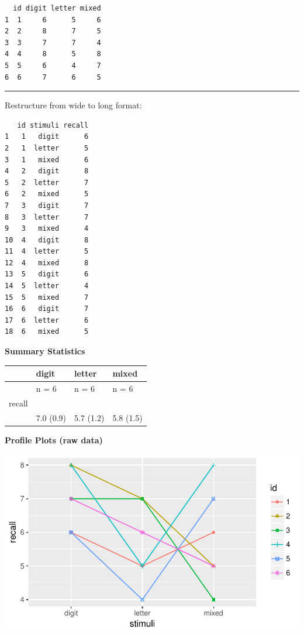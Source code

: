 \documentclass[]{article}
\begin{document}
\begin{verbatim}
  id digit letter mixed
1  1     6      5     6
2  2     8      7     5
3  3     7      7     4
4  4     8      5     8
5  5     6      4     7
6  6     7      6     5
\end{verbatim}

\begin{center}\rule{0.5\linewidth}{\linethickness}\end{center}

Restructure from wide to long format:

\begin{verbatim}
   id stimuli recall
1   1   digit      6
2   1  letter      5
3   1   mixed      6
4   2   digit      8
5   2  letter      7
6   2   mixed      5
7   3   digit      7
8   3  letter      7
9   3   mixed      4
10  4   digit      8
11  4  letter      5
12  4   mixed      8
13  5   digit      6
14  5  letter      4
15  5   mixed      7
16  6   digit      7
17  6  letter      6
18  6   mixed      5
\end{verbatim}

\clearpage

\textbf{Summary Statistics}

\begin{longtable}[]{@{}llll@{}}
\toprule
& digit & letter & mixed\tabularnewline
\midrule
\endhead
& n = 6 & n = 6 & n = 6\tabularnewline
recall & & &\tabularnewline
& 7.0 (0.9) & 5.7 (1.2) & 5.8 (1.5)\tabularnewline
\bottomrule
\end{longtable}

\textbf{Profile Plots (raw data)}

\begin{center}\includegraphics{Unit_5_assignment_SKELETON_R__spr18__files/figure-latex/unnamed-chunk-23-1} \end{center}
\end{document}
